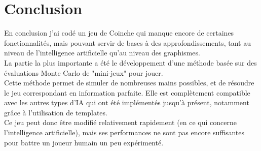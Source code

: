 \documentclass[a4paper,11pt]{article}
\begin{document}
\clearpage
\section*{Conclusion}
En conclusion j'ai codé un jeu de Coinche qui manque encore de certaines fonctionnalités, mais pouvant servir de bases à des approfondissements, tant au niveau de l'intelligence artificielle qu'au niveau des graphismes. \\

La partie la plus importante a été le développement d'une méthode basée sur des évaluations Monte Carlo de "mini-jeux" pour jouer.\\
Cette méthode permet de simuler de nombreuses mains possibles, et de résoudre le jeu correspondant en information parfaite. Elle est complètement compatible avec les autres types d'IA qui ont été implémentés jusqu'à présent, notamment grâce à l'utilisation de templates. \\

Ce jeu peut donc être modifié relativement rapidement (en ce qui concerne l'intelligence artificielle), mais ses performances ne sont pas encore suffisantes pour battre un joueur humain un peu expérimenté.
\end{document}
